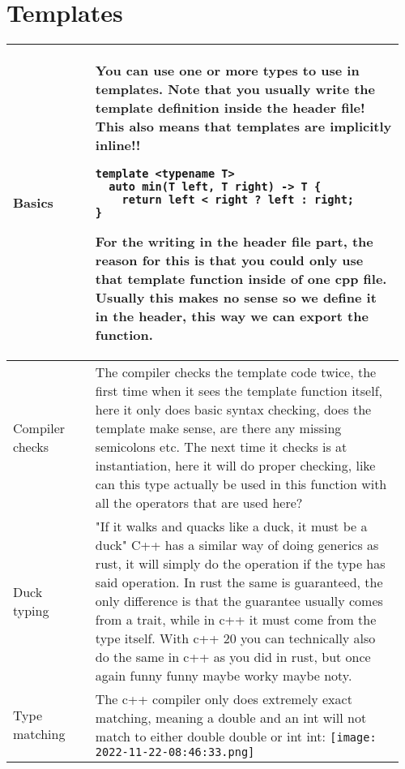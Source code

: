 \documentclass[main.tex,fontsize=8pt,paper=a4,paper=portrait,DIV=calc,]{scrartcl}
\begin{document}
\begin{table}[ht!]
\section{Templates}
\begin{tabular}{|m{0.2\linewidth}|m{0.755\linewidth}|}
\hline
Basics & 
You can use one or more types to use in templates.\newline
\textcolor{OliveGreen}{Note that you usually write the template definition inside the header file!\newline
\textbf{This also means that templates are implicitly inline!!}}\newline
\begin{lstlisting}
template <typename T>
  auto min(T left, T right) -> T {
    return left < right ? left : right;
}
\end{lstlisting} 
For the writing in the header file part, the reason for this is that you could only use that template function inside of one cpp file. Usually this makes no sense so we define it in the header, this way we can export the function.\\
\hline
Compiler checks & 
The compiler checks the template code twice, the first time when it sees the template function itself, here it only does basic syntax checking, does the template make sense, are there any missing semicolons etc.\newline
The next time it checks is at instantiation, here it will do proper checking, like can this type actually be used in this function with all the operators that are used here?\\
\hline
Duck typing & 
"If it walks and quacks like a duck, it must be a duck"\newline
C++ has a similar way of doing generics as rust, it will simply do the operation if the type has said operation.\newline
In rust the same is guaranteed, the only difference is that the guarantee usually comes from a trait, while in c++ it must come from the type itself.\newline
With c++ 20 you can technically also do the same in c++ as you did in rust, but once again funny funny maybe worky maybe noty.\\
\hline
Type matching & 
The c++ compiler only does extremely exact matching, meaning a double and an int will not match to either double double or int int:\newline
\texttt{[image: 2022-11-22-08:46:33.png]}\\

\end{tabular}
\end{table}
\end{document}
